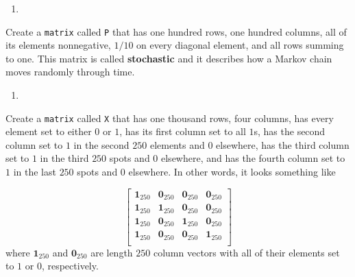 \documentclass[
  12pt,
  krantz2]{krantz}
\providecommand{\tightlist}{%
  \setlength{\itemsep}{0pt}\setlength{\parskip}{0pt}}
\begin{document}
\begin{enumerate}
\def\labelenumi{\arabic{enumi}.}
\setcounter{enumi}{1}
\tightlist
\item
\end{enumerate}

Create a \texttt{matrix} called \texttt{P} that has one hundred rows, one hundred columns, all of its elements nonnegative, \(1/10\) on every diagonal element, and all rows summing to one. This matrix is called \textbf{stochastic} and it describes how a Markov chain moves randomly through time.

\begin{enumerate}
\def\labelenumi{\arabic{enumi}.}
\setcounter{enumi}{2}
\tightlist
\item
\end{enumerate}

Create a \texttt{matrix} called \texttt{X} that has one thousand rows, four columns, has every element set to either \(0\) or \(1\), has its first column set to all \(1\)s, has the second column set to \(1\) in the second \(250\) elements and \(0\) elsewhere, has the third column set to \(1\) in the third \(250\) spots and \(0\) elsewhere, and has the fourth column set to \(1\) in the last \(250\) spots and \(0\) elsewhere. In other words, it looks something like

\begin{equation} 
  \begin{bmatrix}
  \mathbf{1}_{250}  & \mathbf{0}_{250} & \mathbf{0}_{250} & \mathbf{0}_{250} \\
  \mathbf{1}_{250}  & \mathbf{1}_{250} & \mathbf{0}_{250} & \mathbf{0}_{250} \\
  \mathbf{1}_{250}  & \mathbf{0}_{250} & \mathbf{1}_{250} & \mathbf{0}_{250} \\
  \mathbf{1}_{250}  & \mathbf{0}_{250} & \mathbf{0}_{250} & \mathbf{1}_{250} \\
  \end{bmatrix}
\end{equation}
where \(\mathbf{1}_{250}\) and \(\mathbf{0}_{250}\) are length \(250\) column vectors with all of their elements set to \(1\) or \(0\), respectively.
\end{document}
